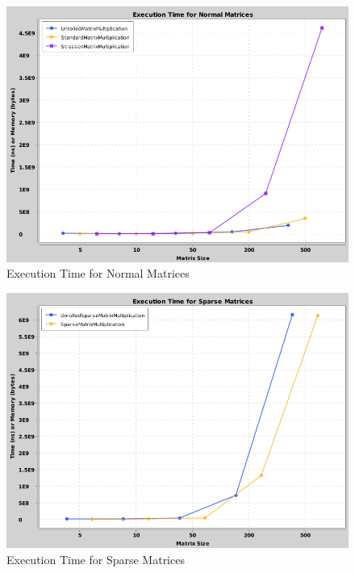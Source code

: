 \documentclass{article}
\begin{document}
\begin{figure}[h]
    \centering
    \includegraphics[width=\textwidth]{time_normal.png}
    \caption{Execution Time for Normal Matrices}
\end{figure}

\begin{figure}[h]
    \centering
    \includegraphics[width=\textwidth]{time_sparse.png}
    \caption{Execution Time for Sparse Matrices}
\end{figure}
\end{document}
